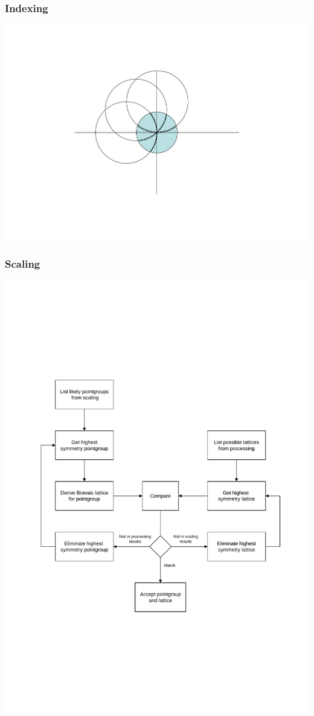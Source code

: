 \documentclass[slides,compress]{beamer}
\begin{document}
\begin{frame}
\frametitle{Indexing}
\hspace{6cm}
\includegraphics[scale=0.5]{figures/Ewald3Image.pdf}
\end{frame}

\begin{frame}
\frametitle{Scaling}
\hspace{2cm}
\includegraphics[scale=0.5]{figures/scaling-step-1.pdf}
\end{frame}
\end{document}

